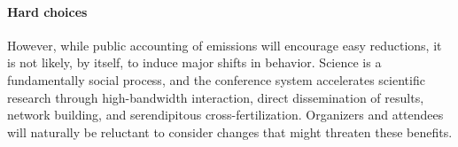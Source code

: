 \documentclass[12pt]{article}
\newcommand{\bcp}[1]{\ifdraft{\bf\textcolor{darkred}{[\bf bcp: #1]}}\fi}
\newcommand{\PARAGRAPH}{\paragraph*}
\begin{document}
\PARAGRAPH{Hard choices}

However, while public accounting of emissions will encourage easy
reductions, it is not likely, by itself, to induce major shifts in behavior.
%
Science is a fundamentally social process, and the conference system
accelerates scientific research through high-bandwidth interaction,
direct dissemination of results, network building, and serendipitous
cross-fertilization.
%
Organizers and attendees will naturally be reluctant to consider changes
that might threaten these benefits.

\end{document}
